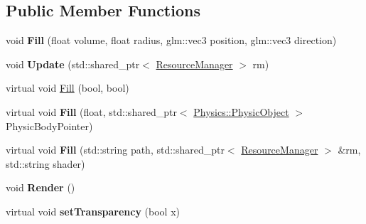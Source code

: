 \subsection*{Public Member Functions}
\begin{DoxyCompactItemize}
\item 
void {\bfseries Fill} (float volume, float radius, glm\+::vec3 position, glm\+::vec3 direction)\hypertarget{class_component_1_1_sound_component_afd7e2ee4833069567bee2759e34c26ed}{}\label{class_component_1_1_sound_component_afd7e2ee4833069567bee2759e34c26ed}

\item 
void {\bfseries Update} (std\+::shared\+\_\+ptr$<$ \hyperlink{class_resource_manager}{Resource\+Manager} $>$ rm)\hypertarget{class_component_1_1_sound_component_a65e8a8fb16901c70eee622b6c1c74214}{}\label{class_component_1_1_sound_component_a65e8a8fb16901c70eee622b6c1c74214}

\item 
virtual void \hyperlink{class_component_1_1_sound_component_aacbe8e7cbf98d8a5f4d826a6b154ffbd}{Fill} (bool, bool)
\item 
virtual void {\bfseries Fill} (float, std\+::shared\+\_\+ptr$<$ \hyperlink{class_physics_1_1_physic_object}{Physics\+::\+Physic\+Object} $>$ Physic\+Body\+Pointer)\hypertarget{class_component_1_1_sound_component_a46a9521fc4b90b9575a19655887d0067}{}\label{class_component_1_1_sound_component_a46a9521fc4b90b9575a19655887d0067}

\item 
virtual void {\bfseries Fill} (std\+::string path, std\+::shared\+\_\+ptr$<$ \hyperlink{class_resource_manager}{Resource\+Manager} $>$ \&rm, std\+::string shader)\hypertarget{class_component_1_1_sound_component_a219c9815a6d44ef076357bdf30ec5a90}{}\label{class_component_1_1_sound_component_a219c9815a6d44ef076357bdf30ec5a90}

\item 
void {\bfseries Render} ()\hypertarget{class_component_1_1_sound_component_af1bc76d7306296621cb04f624fe1c9e2}{}\label{class_component_1_1_sound_component_af1bc76d7306296621cb04f624fe1c9e2}

\item 
virtual void {\bfseries set\+Transparency} (bool x)\hypertarget{class_component_1_1_sound_component_a4e31d0459416ca580dcc60687115e7c2}{}\label{class_component_1_1_sound_component_a4e31d0459416ca580dcc60687115e7c2}

\end{DoxyCompactItemize}
